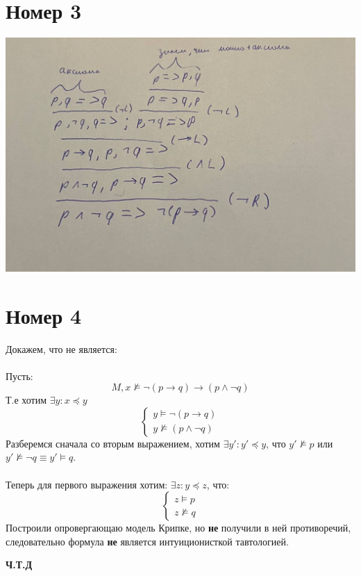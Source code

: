 \documentclass[a4paper,12pt]{article}
\begin{document}
\section*{Номер 3}
\begin{center}
\includegraphics[scale=0.4]{3.jpg}
\end{center}
\clearpage
\section*{Номер 4}
Докажем, что не является:
\\\\
Пусть:
\[
M, x \not \models \neg (p \rightarrow q) \rightarrow (p \wedge \neg q) 
\]
Т.е хотим $\exists y : x \preceq  y$
\[
\begin{cases}
y \models \neg (p \rightarrow  q) \\
y \not \models (p \wedge \neg q)
\end{cases}
\]
Разберемся сначала со вторым выражением, хотим $\exists y' : y' \preceq  y$, что $y' \not \models p$ или $y' \not \models \neg q \equiv y' \models q$.
\\\\
Теперь для первого выражения хотим: $\exists z: y \preceq z$, что:
\[
\begin{cases}
z \models p \\
z \not \models q
\end{cases}
\]
Построили опровергающаю модель Крипке, но \textbf{не} получили в  ней противоречий, следовательно формула \textbf{не} является интуиционисткой тавтологией.
\begin{center}
\textbf{Ч.Т.Д} 
\end{center}
\clearpage
\end{document}
